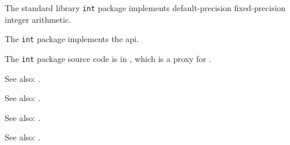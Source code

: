 
The standard library {\tt int} package implements default-precision fixed-precision integer arithmetic.

The {\tt int} package implements the  api.

The {\tt int} package source code is in , 
which is a proxy for .

See also:  .

See also:  .

See also:  .

See also:  .



